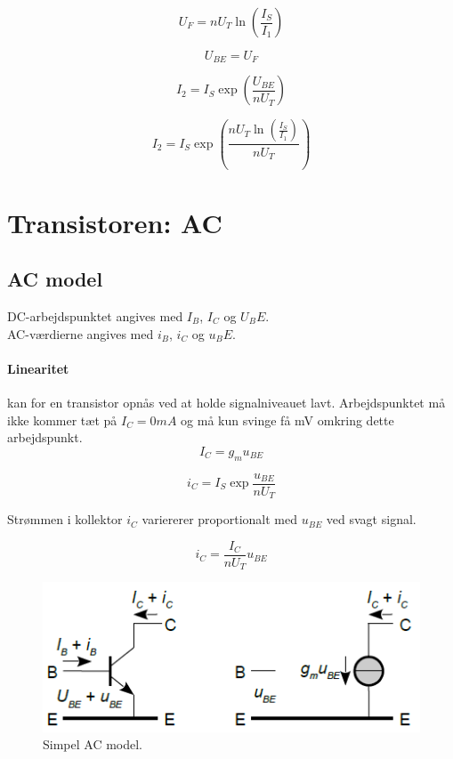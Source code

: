 \documentclass[danish]{article}
\begin{document}
\begin{equation} 
U_F = n U_T \ln{\left(\frac{I_S}{I_1}\right)}
\end{equation}

\begin{equation} 
U_{BE} = U_F
\end{equation}

\begin{equation} 
I_2 = I_S \exp{\left(\frac{U_{BE}}{n U_T}\right)}
\end{equation}

\begin{equation} 
I_2 = I_S \exp{\left(\frac{n U_T \ln{\left(\frac{I_S}{I_1}\right)}}{n U_T}\right)}
\end{equation}

\newpage
\section{Transistoren: AC}
\subsection{AC model}

DC-arbejdspunktet angives med $I_B$, $I_C$ og $U_BE$.\\

AC-værdierne angives med $i_B$, $i_C$ og $u_BE$.

\paragraph{Linearitet} kan for en transistor opnås ved at holde signalniveauet lavt. Arbejdspunktet må ikke kommer tæt på $I_C = 0 mA$ og må kun svinge få mV omkring dette arbejdspunkt. 
\begin{equation} 
I_C = g_m u_{BE}
\end{equation}

\begin{equation} 
i_C = I_S \exp \dfrac{u_{BE}}{n U_T}
\end{equation}

Strømmen i kollektor $i_C$ variererer proportionalt med $u_{BE}$ ved svagt signal.

\begin{equation} 
i_C = \dfrac{I_C}{n U_T} u_{BE}
\end{equation}

\begin{figure} [H]
	\centering
	\includegraphics[width=0.75\linewidth]{graphics/ACmodel}
	\caption{Simpel AC model.}
	\label{fig:ACmodel}
\end{figure}
\end{document}
